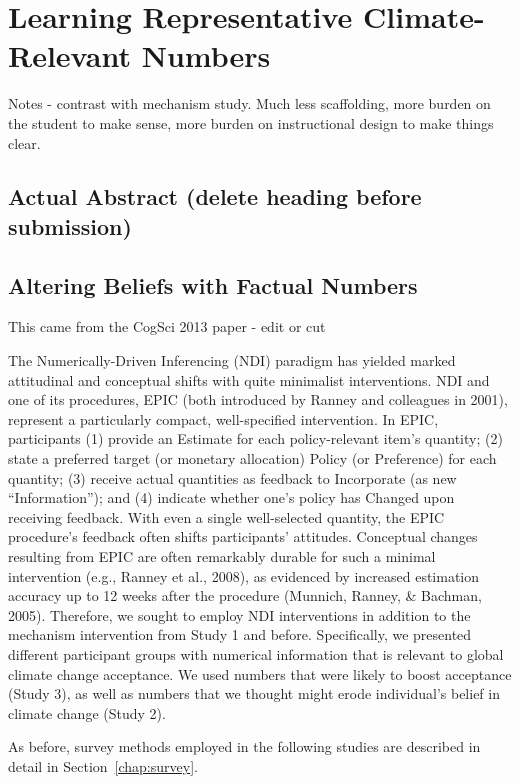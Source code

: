 \graphicspath{{pro-ndi/}}

\chapter{Learning Representative Climate-Relevant Numbers}
\label{chap:prondi}

Notes - contrast with mechanism study. Much less scaffolding, more burden on the
student to make sense, more burden on instructional design to make things clear.

\section{Actual Abstract (delete heading before submission)}

\section{Altering Beliefs with Factual Numbers}

This came from the CogSci 2013 paper - edit or cut

The Numerically-Driven Inferencing (NDI) paradigm has yielded marked
attitudinal and conceptual shifts with quite minimalist interventions. NDI and
one of its procedures, EPIC (both introduced by Ranney and colleagues in 2001),
represent a particularly compact, well-specified intervention. In EPIC,
participants (1) provide an Estimate for each policy-relevant item’s quantity;
(2) state a preferred target (or monetary allocation) Policy (or Preference) for
each quantity; (3) receive actual quantities as feedback to Incorporate (as new
``Information''); and (4) indicate whether one’s policy has Changed upon receiving
feedback. With even a single well-selected quantity, the EPIC procedure’s
feedback often shifts participants’ attitudes. Conceptual changes resulting from
EPIC are often remarkably durable for such a minimal intervention (e.g., Ranney
et al., 2008), as evidenced by increased estimation accuracy up to 12 weeks
after the procedure (Munnich, Ranney, \& Bachman, 2005). Therefore, we sought to
employ NDI interventions in addition to the mechanism intervention from Study 1
and before. Specifically, we presented different participant groups with
numerical information that is relevant to global climate change acceptance. We
used numbers that were likely to boost acceptance (Study 3), as well as numbers
that we thought might erode individual's belief in climate change (Study 2).

As before, survey methods employed in the following studies are described in
detail in Section~\ref{chap:survey}.

